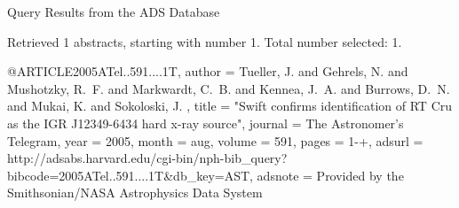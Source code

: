Query Results from the ADS Database


Retrieved 1 abstracts, starting with number 1.  Total number selected: 1.

@ARTICLE{2005ATel..591....1T,
   author = {{Tueller}, J. and {Gehrels}, N. and {Mushotzky}, R.~F. and {Markwardt}, C.~B. and 
	{Kennea}, J.~A. and {Burrows}, D.~N. and {Mukai}, K. and {Sokoloski}, J.
	},
    title = "{Swift confirms identification of RT Cru as the IGR J12349-6434 hard x-ray source}",
  journal = {The Astronomer's Telegram},
     year = 2005,
    month = aug,
   volume = 591,
    pages = {1-+},
   adsurl = {http://adsabs.harvard.edu/cgi-bin/nph-bib_query?bibcode=2005ATel..591....1T&db_key=AST},
  adsnote = {Provided by the Smithsonian/NASA Astrophysics Data System}
}


